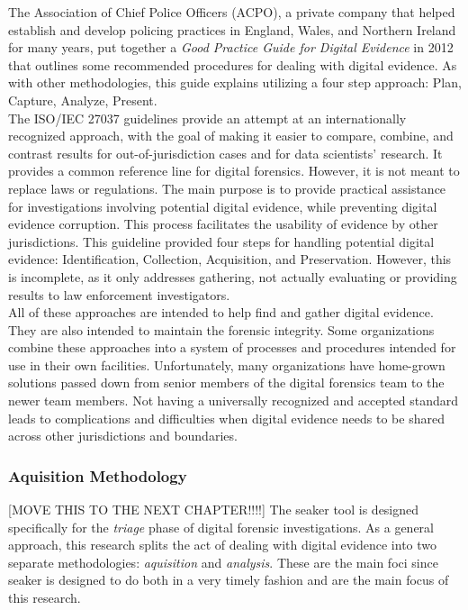 \documentclass[12pt]{article}
\begin{document}
The Association of Chief Police Officers (ACPO), a private company that helped establish and
develop policing practices in England, Wales, and Northern Ireland for many years,
put together a {\em Good Practice Guide for Digital Evidence}\cite{williams2012acpo} in 2012 that outlines some
recommended procedures for dealing with digital evidence.  As with other methodologies, this guide
explains utilizing a four step approach: Plan, Capture, Analyze, Present.\\

The ISO/IEC 27037 guidelines provide an attempt at an internationally 
recognized approach,
with the goal of making it easier to compare, combine, and contrast
results for out-of-jurisdiction cases and for data scientists' research.  It provides a
common reference line for 
digital forensics\cite{ajijola2014review}.  However, it is not meant to replace laws or regulations.
The main purpose is to provide practical
assistance for investigations involving potential digital evidence, while preventing digital
evidence corruption.  This
process facilitates the usability of evidence by other jurisdictions.  This guideline provided
four steps for handling
potential digital evidence: Identification, Collection, Acquisition, and Preservation.  However,
this is incomplete, as
it only addresses gathering, not actually evaluating or providing results to law enforcement
investigators.\\

All of these approaches are intended to help find and gather digital evidence.  They are also intended
to maintain the forensic integrity.  Some organizations combine these approaches into a system of
processes and procedures intended for use in their own facilities.  Unfortunately, many organizations have
home-grown solutions passed down from senior members of the digital forensics team to the newer
team members.  Not having a universally recognized and accepted standard 
leads to complications and difficulties when digital evidence needs to be shared across other
jurisdictions and boundaries\cite{ajijola2014review}.\\

\subsubsection{Aquisition Methodology}

[MOVE THIS TO THE NEXT CHAPTER!!!!]
The \gls{seaker} tool is designed specifically for the {\em triage} phase of digital forensic
investigations.  As a general approach, this research splits the act of dealing with digital evidence into two
separate methodologies: {\em aquisition} and {\em analysis}.  These are the main foci since \gls{seaker} is 
designed to do both in a very timely fashion and are the main focus of this research.\\
\end{document}
